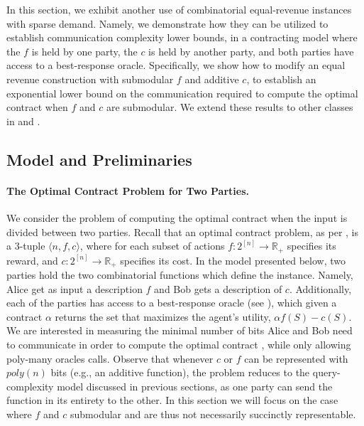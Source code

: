 \documentclass[11pt]{article}
\newcommand{\reals}{\mathbb{R}}
\newcommand{\instance}{\langle n, f, c \rangle}
\begin{document}
In this section, we exhibit another use of combinatorial equal-revenue instances with sparse demand.
Namely, we demonstrate how they can be utilized to establish communication complexity lower bounds, in a contracting model where the $f$ is held by one party, the $c$ is held by another party, and both parties have access to a best-response oracle.
Specifically, we show how to modify an equal revenue construction with submodular $f$ and additive $c$, to establish an exponential lower bound on the communication required to compute the optimal contract when $f$ and $c$ are submodular. We extend these results to other classes in  and .

\subsection{Model and Preliminaries}\label{sec:CC_model}
\paragraph{The Optimal Contract Problem for Two Parties.}

We consider the problem of computing the optimal contract when the input is divided between two parties.
Recall that an optimal contract problem, as per , is a 3-tuple $\instance$, where for each subset of actions $f:2^{[n]} \to \reals_{+}$ specifies its reward, and $c:2^{[n]} \to \reals_{+}$ specifies its cost.
In the model presented below, two parties hold the two combinatorial functions which define the instance. Namely, Alice get as input a description $f$ and Bob gets a description of $c$. Additionally, each of the parties has access to a best-response oracle (see ), which given a contract $\alpha$ returns the set that maximizes the agent's utility, $\alpha f(S) - c(S)$.
We are interested in measuring the minimal number of bits Alice and Bob need to communicate in order to compute the optimal contract , while only allowing poly-many oracles calls.
Observe that whenever $c$ or $f$ can be represented with $poly(n)$ bits (e.g., an additive function), 
the problem reduces to the query-complexity model discussed in previous sections, as one party can send the function in its entirety to the other.
In this section we will focus on the case where $f$ and $c$ submodular and are thus not necessarily succinctly representable.
\end{document}
